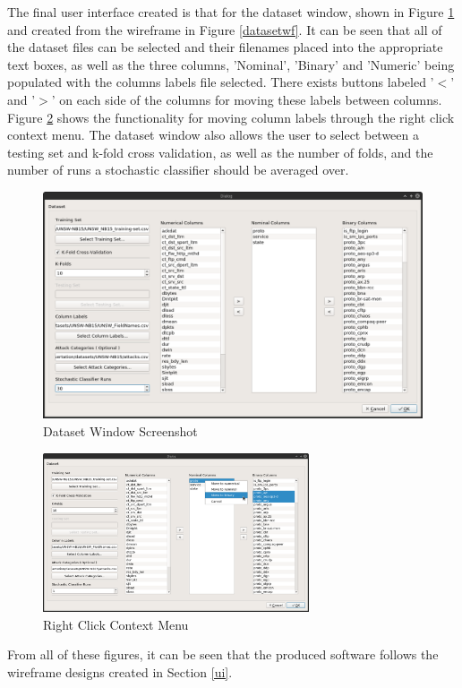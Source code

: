 \documentclass[12pt,a4paper]{article}
\begin{document}
The final user interface created is that for the dataset window, shown in Figure \ref{dsws} and created from the wireframe in Figure \ref{datasetwf}. It can be seen that all of the dataset files can be selected and their filenames placed into the appropriate text boxes, as well as the three columns, 'Nominal', 'Binary' and 'Numeric' being populated with the columns labels file selected. There exists buttons labeled '$<$' and '$>$' on each side of the columns for moving these labels between columns. Figure \ref{rcs} shows the functionality for moving column labels through the right click context menu. The dataset window also allows the user to select between a testing set and k-fold cross validation, as well as the number of folds, and the number of runs a stochastic classifier should be averaged over.
\begin{figure}[H]
	\centering
	\includegraphics[width=1.0\textwidth]{figures/datasetwindowscreenshot}
	\caption{Dataset Window Screenshot}
	\label{dsws}
\end{figure}
\begin{figure}[H]
	\centering
	\includegraphics[trim={17cm 15cm 7cm 1cm}, clip, width=0.7\textwidth]{figures/rcscreenshot}
	\caption{Right Click Context Menu}
	\label{rcs}
\end{figure}
From all of these figures, it can be seen that the produced software follows the wireframe designs created in Section \ref{ui}.
\end{document}
